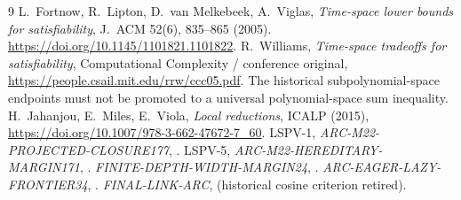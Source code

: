 \documentclass[11pt]{article}
\begin{document}
\begin{thebibliography}{9}\small
{} L.~Fortnow, R.~Lipton,
D.~van Melkebeek, A.~Viglas,
\emph{Time-space lower bounds for satisfiability},
J.~ACM 52(6), 835--865 (2005).
\url{https://doi.org/10.1145/1101821.1101822}.
 R.~Williams,
\emph{Time-space tradeoffs for satisfiability},
Computational Complexity / conference original,
\url{https://people.csail.mit.edu/rrw/ccc05.pdf}.
The historical subpolynomial-space endpoints
must not be promoted to a universal polynomial-space
sum inequality.
 H.~Jahanjou, E.~Miles, E.~Viola,
\emph{Local reductions}, ICALP (2015),
\url{https://doi.org/10.1007/978-3-662-47672-7_60}.
 LSPV-1,
\emph{ARC-M22-PROJECTED-CLOSURE177},
.
 LSPV-5,
\emph{ARC-M22-HEREDITARY-MARGIN171},
.
 \emph{FINITE-DEPTH-WIDTH-MARGIN24},
.
 \emph{ARC-EAGER-LAZY-FRONTIER34},
.
 \emph{FINAL-LINK-ARC},
(historical cosine criterion retired).
\end{thebibliography}
\end{document}
